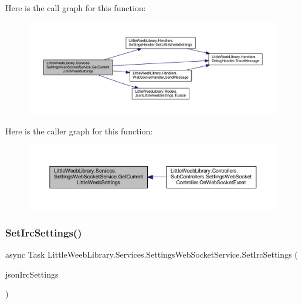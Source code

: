 Here is the call graph for this function\+:\nopagebreak
\begin{figure}[H]
\begin{center}
\leavevmode
\includegraphics[width=350pt]{class_little_weeb_library_1_1_services_1_1_settings_web_socket_service_a50cbfe4ba270c9e84b6b7b427a1b9ce0_cgraph}
\end{center}
\end{figure}
Here is the caller graph for this function\+:\nopagebreak
\begin{figure}[H]
\begin{center}
\leavevmode
\includegraphics[width=350pt]{class_little_weeb_library_1_1_services_1_1_settings_web_socket_service_a50cbfe4ba270c9e84b6b7b427a1b9ce0_icgraph}
\end{center}
\end{figure}
\mbox{\label{class_little_weeb_library_1_1_services_1_1_settings_web_socket_service_a898cb4543b5abd273844405770687442}} 
\subsubsection{\texorpdfstring{Set\+Irc\+Settings()}{SetIrcSettings()}}
{\footnotesize\ttfamily async Task Little\+Weeb\+Library.\+Services.\+Settings\+Web\+Socket\+Service.\+Set\+Irc\+Settings (\begin{DoxyParamCaption}\item[{J\+Object}]{json\+Irc\+Settings }\end{DoxyParamCaption})}



